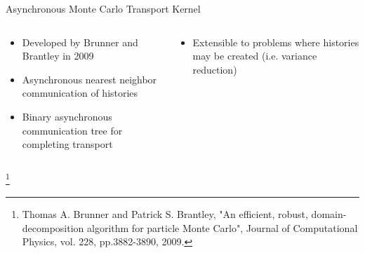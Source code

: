 \documentclass{beamer}
\begin{document}
\begin{frame}{Asynchronous Monte Carlo Transport Kernel}

  \begin{columns}

    \begin{column}{0.5\textwidth}

      \begin{itemize}
      \item Developed by Brunner and Brantley in 2009
      \item Asynchronous nearest neighbor communication of histories
      \item Binary asynchronous communication tree for completing
        transport
      \end{itemize}

      \begin{figure}[htpb!]
        \begin{center}
          \scalebox{0.45}{  }
        \end{center}
      \end{figure}

    \end{column}

    \begin{column}{0.5\textwidth}

      \begin{itemize}
      \item Extensible to problems where histories may be created
        (i.e. variance reduction)
      \end{itemize}

      \begin{figure}[htpb!]
        \begin{center}
          \scalebox{0.45}{  }
        \end{center}
      \end{figure}

    \end{column}


  \end{columns}

  \let\thefootnote\relax\footnote{\tiny{Thomas A. Brunner and Patrick
      S. Brantley, "An efficient, robust, domain-decomposition
      algorithm for particle Monte Carlo", Journal of Computational
      Physics, vol. 228, pp.3882-3890, 2009.}}
\end{frame}
\end{document}
